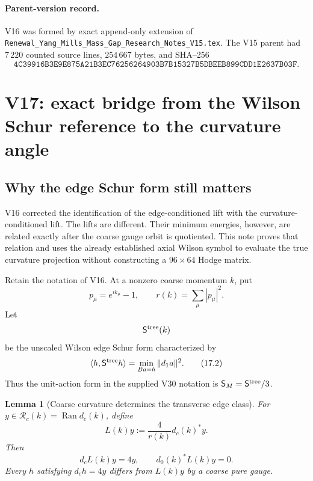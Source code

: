 \documentclass[11pt,oneside]{book}
\newtheorem{lemma}[theorem]{Lemma}
\theoremstyle{definition}
\theoremstyle{remark}
\begin{document}
\paragraph{Parent-version record.}
V16 was formed by exact append-only extension of
\texttt{Renewal\_Yang\_Mills\_Mass\_Gap\_Research\_Notes\_V15.tex}.
The V15 parent had \(7\,220\) counted source lines,
\(254\,667\) bytes, and SHA--256
\[
\texttt{4C39916B3E9E875A21B3EC76256264903B7B15327B5DBEEB899CDD1E2637B03F}.
\]



\section{V17: exact bridge from the Wilson Schur reference to the
curvature angle}
\label{sec:e8v17}

\subsection{Why the edge Schur form still matters}

V16 corrected the identification of the edge-conditioned lift with
the curvature-conditioned lift.  The lifts are different.  Their
minimum energies, however, are related exactly after the coarse gauge
orbit is quotiented.  This note proves that relation and uses the
already established axial Wilson symbol to evaluate the true
curvature projection without constructing a \(96\times64\) Hodge
matrix.

Retain the notation of V16.  At a nonzero coarse momentum \(k\), put
\[
 p_\mu=e^{ik_\mu}-1,\qquad
 r(k)=\sum_\mu|p_\mu|^2.                            \tag{17.1}
\]
Let
\[
 \mathsf S^{\rm tree}(k)
\]
be the unscaled Wilson edge Schur form characterized by
\[
 \langle h,\mathsf S^{\rm tree}h\rangle
 =\min_{Ba=h}\|d_1a\|^2.                            \tag{17.2}
\]
Thus the unit-action form in the supplied V30 notation is
\(\mathsf S_M=\mathsf S^{\rm tree}/3\).

\begin{lemma}[Coarse curvature determines the transverse edge class]
\label{lem:e8v17-gauge-class}
For \(y\in\mathcal R_c(k)=\operatorname{Ran}d_c(k)\), define
\[
             L(k)y:=\frac4{r(k)}d_c(k)^*y.          \tag{17.3}
\]
Then
\[
 d_cL(k)y=4y,\qquad d_0(k)^*L(k)y=0.                \tag{17.4}
\]
Every \(h\) satisfying \(d_ch=4y\) differs from \(L(k)y\) by a coarse
pure gauge.
\end{lemma}
\end{document}
